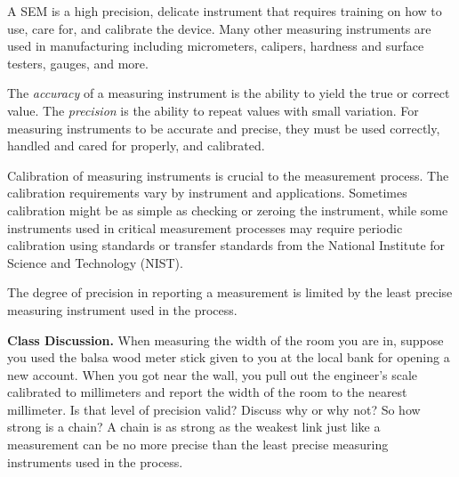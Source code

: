 \documentclass{ximera}
\begin{document}
\begin{center}
      \end{center}

A SEM is a high precision, delicate instrument that requires training on how to use, care for, and calibrate the device. Many other measuring instruments are used in manufacturing including micrometers, calipers, hardness and surface testers, gauges, and more. 

The \emph{accuracy} of a measuring instrument is the ability to yield the true or correct value.  The \emph{precision} is the ability to repeat values with small variation. For measuring instruments to be accurate and precise, they must be used correctly, handled and cared for properly, and calibrated. 

Calibration of measuring instruments is crucial to the measurement process. The calibration requirements vary by instrument and applications. Sometimes calibration might be as simple as checking or zeroing the instrument, while some instruments used in critical measurement processes may require periodic calibration using standards or transfer standards from the National Institute for Science and Technology (NIST).
    
The degree of precision in reporting a measurement is limited by the least precise measuring instrument used in the process. 

\begin{question}\label{q:lengthOfRoom}
\textbf{Class Discussion.} When measuring the width of the room you are in, suppose you used the balsa wood meter stick given to you at the local bank for opening a new account.  When you got near the wall, you pull out the engineer’s scale calibrated to millimeters and report the width of the room to the nearest millimeter.  Is that level of precision valid?  Discuss why or why not?   So how strong is a chain?  A chain is as strong as the weakest link just like a measurement can be no more precise than the least precise measuring instruments used in the process. 
\end{question}
\end{document}
